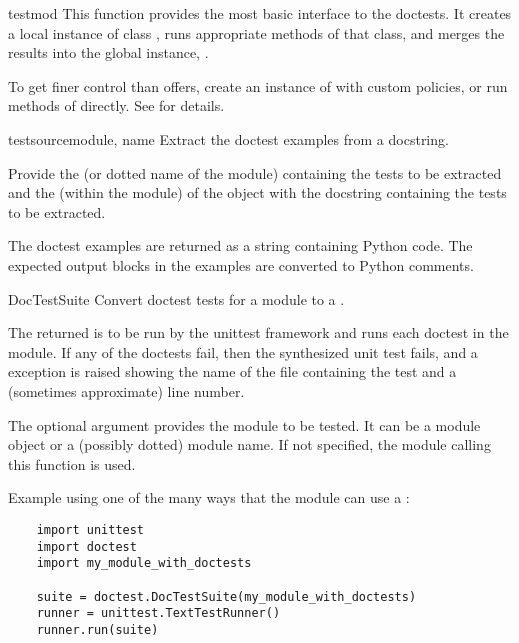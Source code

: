 \begin{funcdesc}{testmod}{}
  This function provides the most basic interface to the doctests.
  It creates a local instance of class , runs appropriate
  methods of that class, and merges the results into the global 
  instance, .

  To get finer control than  offers, create an instance
  of  with custom policies, or run methods of 
  directly.  See  for details.
\end{funcdesc}

\begin{funcdesc}{testsource}{module, name}
  Extract the doctest examples from a docstring.

  Provide the  (or dotted name of the module) containing the
  tests to be extracted and the  (within the module) of the object
  with the docstring containing the tests to be extracted.

  The doctest examples are returned as a string containing Python
  code.  The expected output blocks in the examples are converted
  to Python comments.
\end{funcdesc}

\begin{funcdesc}{DocTestSuite}{}
  Convert doctest tests for a module to a
  .

  The returned  is to be run by the unittest framework
  and runs each doctest in the module.  If any of the doctests fail,
  then the synthesized unit test fails, and a 
  exception is raised showing the name of the file containing the test and a
  (sometimes approximate) line number.

  The optional  argument provides the module to be tested.  It
  can be a module object or a (possibly dotted) module name.  If not
  specified, the module calling this function is used.

  Example using one of the many ways that the  module
  can use a :

  \begin{verbatim}
    import unittest
    import doctest
    import my_module_with_doctests

    suite = doctest.DocTestSuite(my_module_with_doctests)
    runner = unittest.TextTestRunner()
    runner.run(suite)
  \end{verbatim}

\end{funcdesc}


